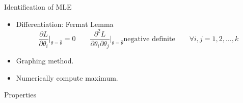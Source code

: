     \begin{point}
        Identification of MLE
    \end{point}
    
    \begin{itemize}[topsep=2pt,itemsep=0pt]
        \item Differentiation: Fermat Lemma
        \begin{equation}
            \frac{\partial L}{\partial \theta_i}\bigg|_{\theta=\hat{\theta}}=0\qquad \frac{\partial^2 L}{\partial \theta_i \partial \theta_j}\bigg|_{\theta=\hat{\theta}}\text{negative definite}\qquad \forall i,j=1,2,\ldots,k
        \end{equation}
        \item Graphing method.
        \item Numerically compute maximum.
    \end{itemize}

    \begin{point}
        Properties
    \end{point}
    
